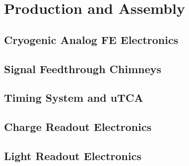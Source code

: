 \section{Production and Assembly}
\label{sec:fddp-tpc-elec-prod-assy}

\subsection{Cryogenic Analog FE Electronics}
\label{sec:fddp-tpc-elec-prod-fe}

\subsection{Signal Feedthrough Chimneys}
\label{sec:fddp-tpc-elec-prod-sft}

\subsection{Timing System and uTCA}
\label{sec:fddp-tpc-elec-prod-utca}



\subsection{Charge Readout Electronics}
\label{sec:fddp-tpc-elec-prod-cro}

\subsection{Light Readout Electronics}
\label{sec:fddp-tpc-elec-prod-lro}


